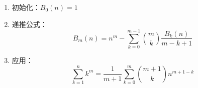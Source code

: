 \begin{enumerate}
	\item 初始化：$B_0(n) = 1$
	\item 递推公式：
	\[B_m(n) = n^m - \sum_{k = 0}^{m - 1}\binom{m}{k} \frac{B_k(n)}{m - k + 1}\]
	\item 应用：
	\[\sum_{k = 1}^{n} k^m = \frac{1}{m + 1}\sum_{k = 0}^{m}\binom{m + 1}{k}n^{m + 1 - k}\]
\end{enumerate}
